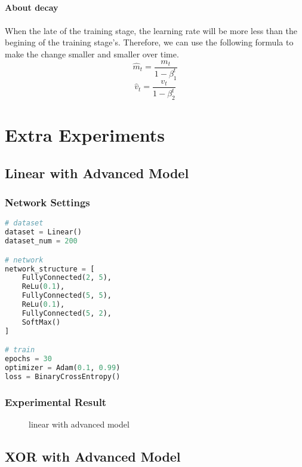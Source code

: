 \paragraph{About decay}
\paragraph{}
When the late of the training stage, the learning rate will be more less than the begining of the training stage's. Therefore, we can use the following formula to make the change smaller and smaller over time.
$$\hat{m}_t = \frac{m_t}{1 - \beta_1^t}$$
$$\hat{v}_t = \frac{v_t}{1 - \beta_2^t}$$

\section{Extra Experiments}
\subsection{Linear with Advanced Model}
\subsubsection{Network Settings}
\begin{lstlisting}[language=Python]
# dataset
dataset = Linear()
dataset_num = 200

# network
network_structure = [
    FullyConnected(2, 5),
    ReLu(0.1),
    FullyConnected(5, 5),
    ReLu(0.1),
    FullyConnected(5, 2),
    SoftMax()
]

# train
epochs = 30
optimizer = Adam(0.1, 0.99)
loss = BinaryCrossEntropy()
\end{lstlisting}

\subsubsection{Experimental Result}
\begin{figure}[!ht]
    \centering
    \qquad
    \qquad
    \qquad
    \caption{linear with advanced model}
\end{figure}

\newpage
\subsection{XOR with Advanced Model}
